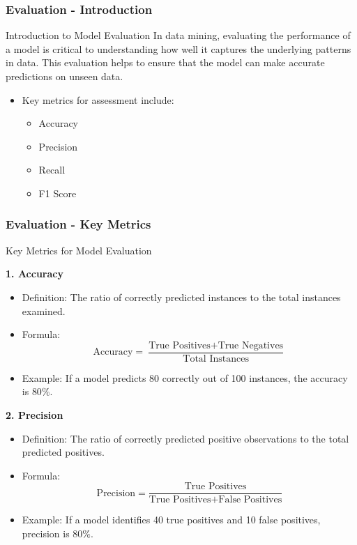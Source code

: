 \documentclass[aspectratio=169]{beamer}
\begin{document}
\begin{frame}[fragile]
    \frametitle{Evaluation - Introduction}
    \begin{block}{Introduction to Model Evaluation}
        In data mining, evaluating the performance of a model is critical to understanding how well it captures the underlying patterns in data. This evaluation helps to ensure that the model can make accurate predictions on unseen data.
    \end{block}
    \begin{itemize}
        \item Key metrics for assessment include:
            \begin{itemize}
                \item Accuracy
                \item Precision
                \item Recall
                \item F1 Score
            \end{itemize}
    \end{itemize}
\end{frame}

\begin{frame}[fragile]
    \frametitle{Evaluation - Key Metrics}
    \begin{block}{Key Metrics for Model Evaluation}

        \textbf{1. Accuracy}
        \begin{itemize}
            \item Definition: The ratio of correctly predicted instances to the total instances examined.
            \item Formula:
            \begin{equation}
                \text{Accuracy} = \frac{\text{True Positives} + \text{True Negatives}}{\text{Total Instances}}
            \end{equation}
            \item Example: If a model predicts 80 correctly out of 100 instances, the accuracy is \(80\%\).
        \end{itemize}
        
        \textbf{2. Precision}
        \begin{itemize}
            \item Definition: The ratio of correctly predicted positive observations to the total predicted positives.
            \item Formula:
            \begin{equation}
                \text{Precision} = \frac{\text{True Positives}}{\text{True Positives} + \text{False Positives}}
            \end{equation}
            \item Example: If a model identifies 40 true positives and 10 false positives, precision is \(80\%\).
        \end{itemize}

    \end{block}
\end{frame}
\end{document}
